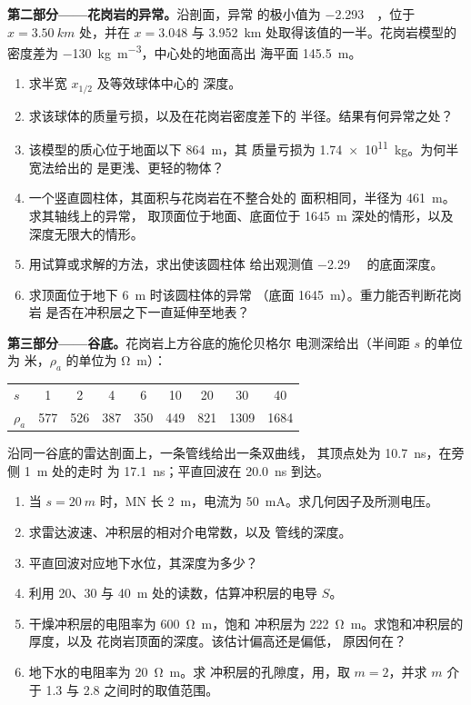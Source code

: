 \begin{problem}
\medskip\noindent\textbf{第二部分——花岗岩的异常。}沿剖面，异常
的极小值为 \qty{-2.293}{\milli\gal}，位于
$x = \qty{3.50}{km}$ 处，并在 $x = 3.048$ 与
\qty{3.952}{km} 处取得该值的一半。花岗岩模型的密度差为
\qty{-130}{kg.m^{-3}}，中心处的地面高出
海平面 \qty{145.5}{m}。
\begin{enumerate}[resume]
\item 求半宽 $x_{1/2}$ 及等效球体中心的
  深度。
\item 求该球体的质量亏损，以及在花岗岩密度差下的
  半径。结果有何异常之处？
\item 该模型的质心位于地面以下 \qty{864}{m}，其
  质量亏损为 \qty{1.74e11}{kg}。为何半宽法给出的
  是更浅、更轻的物体？
\item 一个竖直圆柱体，其面积与花岗岩在不整合处的
  面积相同，半径为 \qty{461}{m}。求其轴线上的异常，
  取顶面位于地面、底面位于 \qty{1645}{m} 深处的情形，以及
  深度无限大的情形。
\item 用试算或求解的方法，求出使该圆柱体
  给出观测值 \qty{-2.29}{\milli\gal} 的底面深度。
\item 求顶面位于地下 \qty{6}{m} 时该圆柱体的异常
  （底面 \qty{1645}{m}）。重力能否判断花岗岩
  是否在冲积层之下一直延伸至地表？
\end{enumerate}

\medskip\noindent\textbf{第三部分——谷底。}花岗岩上方谷底的施伦贝格尔
电测深给出（半间距 $s$ 的单位为
米，$\rho_a$ 的单位为 \unit{\ohm\metre}）：
\begin{center}
\small
\begin{tabular}{lcccccccc}
\hline
$s$ & 1 & 2 & 4 & 6 & 10 & 20 & 30 & 40 \\
$\rho_a$ & 577 & 526 & 387 & 350 & 449 & 821 & 1309 & 1684 \\
\hline
\end{tabular}
\end{center}
沿同一谷底的雷达剖面上，一条管线给出一条双曲线，
其顶点处为 \qty{10.7}{ns}，在旁侧 \qty{1}{m} 处的走时
为 \qty{17.1}{ns}；平直回波在 \qty{20.0}{ns} 到达。
\begin{enumerate}[resume]
\item 当 $s = \qty{20}{m}$ 时，MN 长 \qty{2}{m}，电流为
  \qty{50}{mA}。求几何因子及所测电压。
\item 求雷达波速、冲积层的相对介电常数，以及
  管线的深度。
\item 平直回波对应地下水位，其深度为多少？
\item 利用
  20、30 与 \qty{40}{m} 处的读数，估算冲积层的电导 $S$。
\item 干燥冲积层的电阻率为 \qty{600}{\ohm\metre}，饱和
  冲积层为 \qty{222}{\ohm\metre}。求饱和冲积层的厚度，以及
  花岗岩顶面的深度。该估计偏高还是偏低，
  原因何在？
\item 地下水的电阻率为 \qty{20}{\ohm\metre}。求
  冲积层的孔隙度，用，取 $m = 2$，并求 $m$
  介于 \num{1.3} 与 \num{2.8} 之间时的取值范围。
\end{enumerate}


\end{problem}
